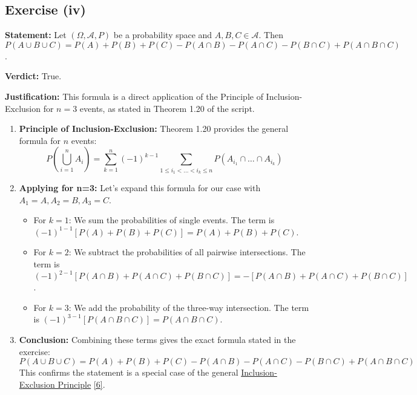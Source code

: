 \documentclass[11pt,a4paper]{article}
\begin{document}
\subsection*{Exercise (iv)}
\textbf{Statement:} Let $(\Omega, \mathcal{A}, P)$ be a probability space and $A, B, C \in \mathcal{A}$. Then
$P(A \cup B \cup C) = P(A) + P(B) + P(C) - P(A \cap B) - P(A \cap C) - P(B \cap C) + P(A \cap B \cap C)$.

\vspace{1em}

\textbf{Verdict:} True.

\textbf{Justification:}
This formula is a direct application of the Principle of Inclusion-Exclusion for $n=3$ events, as stated in Theorem 1.20 of the script.

\begin{enumerate}
    \item \textbf{Principle of Inclusion-Exclusion:} Theorem 1.20 provides the general formula for $n$ events:
    \[
        P\left(\bigcup_{i=1}^n A_i\right) = \sum_{k=1}^n (-1)^{k-1} \sum_{1 \le i_1 < \dots < i_k \le n} P(A_{i_1} \cap \dots \cap A_{i_k})
    \]

    \item \textbf{Applying for n=3:} Let's expand this formula for our case with $A_1=A, A_2=B, A_3=C$.
    \begin{itemize}
        \item For $k=1$: We sum the probabilities of single events. The term is $(-1)^{1-1} [P(A) + P(B) + P(C)] = P(A) + P(B) + P(C)$.
        \item For $k=2$: We subtract the probabilities of all pairwise intersections. The term is $(-1)^{2-1} [P(A \cap B) + P(A \cap C) + P(B \cap C)] = -[P(A \cap B) + P(A \cap C) + P(B \cap C)]$.
        \item For $k=3$: We add the probability of the three-way intersection. The term is $(-1)^{3-1} [P(A \cap B \cap C)] = P(A \cap B \cap C)$.
    \end{itemize}

    \item \textbf{Conclusion:} Combining these terms gives the exact formula stated in the exercise:
    \[
        P(A \cup B \cup C) = P(A) + P(B) + P(C) - P(A \cap B) - P(A \cap C) - P(B \cap C) + P(A \cap B \cap C)
    \]
    This confirms the statement is a special case of the general \hyperlink{note6}{Inclusion-Exclusion Principle} \hyperlink{note6}{[6]}.
\end{enumerate}
\end{document}

